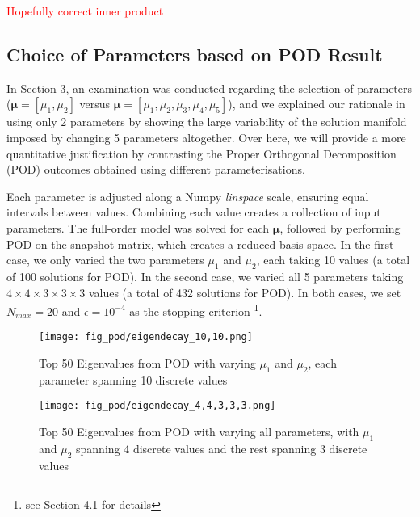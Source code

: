\textcolor{red}{Hopefully correct inner product}



\subsection{Choice of Parameters based on POD Result}
In Section 3, an examination was conducted regarding the selection of parameters ($\bm{\mu}=[\mu_1, \mu_2]$ versus $\bm{\mu} = [\mu_1, \mu_2, \mu_3, \mu_4, \mu_5]$), and we explained our rationale in using only 2 parameters by showing the large variability of the solution manifold imposed by changing 5 parameters altogether. Over here, we will provide a more quantitative justification by contrasting the Proper Orthogonal Decomposition (POD) outcomes obtained using different parameterisations. 

Each parameter is adjusted along a Numpy \textit{linspace} scale, ensuring equal intervals between values. Combining each value creates a collection of input parameters. The full-order model was solved for each $\bm{\mu}$, followed by performing POD on the snapshot matrix, which creates a reduced basis space. In the first case, we only varied the two parameters $\mu_1$ and $\mu_2$, each taking 10 values (a total of 100 solutions for POD). In the second case, we varied all 5 parameters taking $4 \times 4 \times 3 \times 3 \times 3$ values (a total of 432 solutions for POD). In both cases, we set $N_{max} = 20$ and $\epsilon = 10^{-4}$ as the stopping criterion \footnote{see Section 4.1 for details}.

\begin{figure}[!h]
    \centering
    \texttt{[image: fig\_pod/eigendecay\_10,10.png]}
    \caption{Top 50 Eigenvalues from POD with varying $\mu_1$ and $\mu_2$, each parameter spanning 10 discrete values}
    \label{fig:eigendecay_10by10}
\end{figure}

\begin{figure}[!h]
    \centering
    \texttt{[image: fig\_pod/eigendecay\_4,4,3,3,3.png]}
    \caption{Top 50 Eigenvalues from POD with varying all parameters, with $\mu_1$ and $\mu_2$ spanning 4 discrete values and the rest spanning 3 discrete values}
    \label{fig:eigendecay_allvary}
\end{figure}

